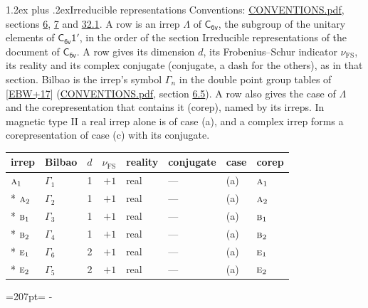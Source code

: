 \documentclass[10pt,a4paper]{article}
\makeatletter
\renewcommand\section{\@startsection{section}{1}{\z@}{-3ex plus -1ex minus -.2ex}%
  {1.2ex plus .2ex}{\normalfont\large\sffamily\bfseries\color{parttitle}}}
\newcommand{\needspace}[1]{\par\penalty-100\begingroup\dimen0=#1\relax\dimen2=\pagegoal
  \advance\dimen2-\pagetotal\ifdim\dimen0>\dimen2\relax\ifdim\dimen2>0pt\vfil\break\fi\fi
  \endgroup}
\numberwithin{equation}{section}
\newcommand{\grp}[1]{\mathsf{#1}}
\newcommand{\irr}[1]{\text{\normalfont\scshape #1}}
\newcommand{\fsind}{\nu_{\mathrm{FS}}}
\makeatother
\begin{document}
\section{Irreducible representations}\label{s:irreps}
Conventions: \href{../../CONVENTIONS.pdf}{CONVENTIONS.pdf}, sections \href{../../../rotation/CONVENTIONS.pdf\#conv.6}{6}, \href{../../../rotation/CONVENTIONS.pdf\#conv.7}{7} and \href{../../CONVENTIONS.pdf\#conv.32.1}{32.1}.
\leavevmode\label{n:irrep.Delta}A row is an irrep $\Lambda$ of $\grp{C_{6v}}$, the subgroup of the unitary elements of $\grp{C_{6v}1'}$, in the order of the section Irreducible representations of the document of \href{../../../rotation/data/pdf/C6v.pdf}{$\grp{C_{6v}}$}. \label{n:index.dimension}\label{n:index.frobenius}\label{n:head.irrep}\label{n:head.reality}\label{n:head.conjugate}A row gives its dimension $d$, its Frobenius--Schur indicator $\fsind$, its reality and its complex conjugate (conjugate, a dash for the others), as in that section. \label{n:head.bilbao}\label{n:irrep.alias.gamma}Bilbao is the irrep's symbol $\Gamma_n$ in the double point group tables of [\href{../../../REFERENCES.pdf\#ref.EBW+17}{EBW+17}] (\href{../../CONVENTIONS.pdf}{CONVENTIONS.pdf}, section \href{../../../rotation/CONVENTIONS.pdf\#conv.6.5}{6.5}). \label{n:head.case.corep}\label{n:head.corep}A row also gives the case of $\Lambda$ and the corepresentation that contains it (corep), named by its irreps. In magnetic type II a real irrep alone is of case (a), and a complex irrep forms a corepresentation of case (c) with its conjugate.
\setlength{\emergencystretch}{2em}\par\setlength{\emergencystretch}{0pt}
{\small\renewcommand{\arraystretch}{1.25}\setlength{\tabcolsep}{4pt}\begin{longtable}{@{}llrrllll@{}}\toprule
irrep & Bilbao & $d$ & $\fsind$ & reality & conjugate & case & corep\\\midrule\endhead
\bottomrule\endfoot\endlastfoot
$\irr{a}_{1}$ & $\Gamma_{1}$ & 1 & $+1$ & real & --- & (a) & $\irr{a}_{1}$\\*
$\irr{a}_{2}$ & $\Gamma_{2}$ & 1 & $+1$ & real & --- & (a) & $\irr{a}_{2}$\\*
$\irr{b}_{1}$ & $\Gamma_{3}$ & 1 & $+1$ & real & --- & (a) & $\irr{b}_{1}$\\*
$\irr{b}_{2}$ & $\Gamma_{4}$ & 1 & $+1$ & real & --- & (a) & $\irr{b}_{2}$\\*
$\irr{e}_{1}$ & $\Gamma_{6}$ & 2 & $+1$ & real & --- & (a) & $\irr{e}_{1}$\\*
$\irr{e}_{2}$ & $\Gamma_{5}$ & 2 & $+1$ & real & --- & (a) & $\irr{e}_{2}$\\
\bottomrule\end{longtable}}
\needspace{207pt}
\end{document}
